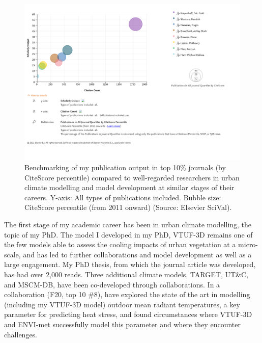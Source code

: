 \begin{figure}
\includegraphics[trim={20 800 150 20},clip,scale=0.12]{metrics/K-Nice-2-2021.png}
\caption{Benchmarking of my publication output in top 10\% journals (by CiteScore percentile) compared to well-regarded researchers in urban climate modelling and model development at similar stages of their careers. Y-axis: All types of publications included. Bubble size: CiteScore percentile (from 2011 onward) (Source: Elsevier SciVal).}
\label{fig:benchmark}
\end{figure}


The first stage of my academic career has been in urban climate modelling, the topic of my PhD. The model I developed in my PhD, VTUF-3D remains one of the few models able to assess the cooling impacts of urban vegetation at a micro-scale, and has led to further collaborations and model development as well as a large engagement. My PhD thesis, from which the journal article was developed, has had over 2,000 reads. Three additional climate models, TARGET, UT\&C, and MSCM-DB, have been co-developed through collaborations. In a collaboration (F20, top 10 \#8), have explored the state of the art in modelling (including my VTUF-3D model) outdoor mean radiant temperatures, a key parameter for predicting heat stress, and found circumstances where VTUF-3D and ENVI-met successfully model this parameter and where they encounter challenges. 

